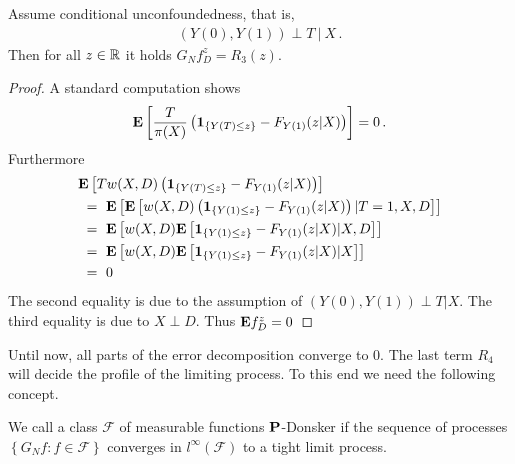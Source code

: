 \begin{lemma}
  \label{aa:mean:l:r3}
  Assume conditional unconfoundedness, that is,
  \begin{gather}
  (Y(0),Y(1))\perp T \ |\ X
  \,.
  \end{gather}
  Then for all
  $z\in\R$
  it holds
  $
  G_Nf_D^z=R_3(z)
  $.
\end{lemma}
\begin{proof}
  A standard computation shows
  \begin{gather}
    \E
    \left[ 
    \frac{T}{\pi(X)}
    \left( 
    \mathbf{1}_{\left\{ Y(T) \le z \right\}}
    -
  F_{Y(1)}(z|X)
    \right)
    \right]
    =0
    \,.
  \end{gather}
  Furthermore
  \begin{align*}
    &
    \E
    \left[ 
      Tw(X,D)
    \left( 
    \mathbf{1}_{\left\{ Y(T) \le z \right\}}
    -
  F_{Y(1)}(z|X)
    \right)
    \right]
    \\
    &
    \ 
    =
    \ 
    \E
    \left[ 
      \E
      \left[ 
      w(X,D)
      \left( 
    \mathbf{1}_{\left\{ Y(1) \le z \right\}}
    -
  F_{Y(1)}(z|X)
      \right)
  |T=1,X,D
      \right]
    \right]
    \\
    &
    \ 
    =
    \ 
    \E
    \left[ 
      w(X,D)
      \E
      \left[ 
    \mathbf{1}_{\left\{ Y(1) \le z \right\}}
    -
  F_{Y(1)}(z|X)
  |X,D
      \right]
    \right]
    \\
    &
    \ 
    =
    \ 
    \E
    \left[ 
      w(X,D)
      \E
      \left[ 
    \mathbf{1}_{\left\{ Y(1) \le z \right\}}
    -
  F_{Y(1)}(z|X)
  |X
      \right]
    \right]
    \\
    &
    \ 
    =
    \ 
    0
  \end{align*}
  The second equality is due to the assumption of 
  $(Y(0),Y(1))\perp T |X$.
  The third equality is due to $X\perp D$.
  Thus
  $
    \E
    f_D^z
    =
    0
  $
\end{proof}

Until now, all parts of the error decomposition converge to 0.
The last term $R_4$ will decide the profile of the limiting process.
To this end we need the following concept.
\begin{definition}
  We call a class 
  $\mathcal{F}$ of measurable functions 
$\P$-Donsker
if the sequence of processes 
$\left\{ G_N f \colon f\in\mathcal{F}\right\}$
converges in
$l^\infty(\mathcal{F})$
to a tight limit process.
\end{definition}

